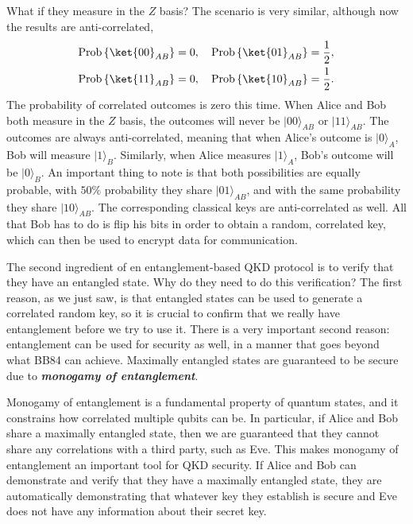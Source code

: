 What if they measure in the $Z$ basis? The scenario is very similar, although now the results are anti-correlated,
\begin{align}
\begin{aligned}
    \operatorname{Prob}\left\{\ket{00}_{A B}\right\} & = 0, \quad \operatorname{Prob}\left\{\ket{01}_{A B}\right\} = \frac{1}{2}, \\ 
    \operatorname{Prob}\left\{\ket{11}_{A B}\right\} & = 0, \quad \operatorname{Prob}\left\{\ket{10}_{A B}\right\} = \frac{1}{2}.
\end{aligned}
\end{align}
The probability of correlated outcomes is zero this time.
When Alice and Bob both measure in the $Z$ basis, the outcomes will never be $|00\rangle_{AB}$ or $|11\rangle_{AB}$.
The outcomes are always anti-correlated, meaning that when Alice's outcome is $|0\rangle_A$, Bob will measure $|1\rangle_B$.
Similarly, when Alice measures $|1\rangle_A$, Bob's outcome will be $|0\rangle_B$.
An important thing to note is that both possibilities are equally probable, with $50\%$ probability they share $|01\rangle_{AB}$, and with the same probability they share $|10\rangle_{AB}$.
The corresponding classical keys are anti-correlated as well.
All that Bob has to do is flip his bits in order to obtain a random, correlated key, which can then be used to encrypt data for communication.

The second ingredient of en entanglement-based QKD protocol is to verify that they have an entangled state.
Why do they need to do this verification?
The first reason, as we just saw, is that entangled states can be used to generate a correlated random key, so it is crucial to confirm that we really have entanglement before we try to use it.
There is a very important second reason: entanglement can be used for security as well, in a manner that goes beyond what BB84 can achieve. Maximally entangled states are guaranteed to be secure due to \textbf{\emph{monogamy of entanglement}}.

Monogamy of entanglement is a fundamental property of quantum states,
and it constrains how correlated multiple qubits can be.
In particular, if Alice and Bob share a maximally entangled state,
then we are guaranteed that they cannot share any correlations with a third party, such as Eve.
This makes monogamy of entanglement an important tool for QKD security.
If Alice and Bob can demonstrate and verify that they have a maximally entangled state, they are automatically demonstrating that whatever
key they establish is secure and Eve does not have any information about their secret key.

